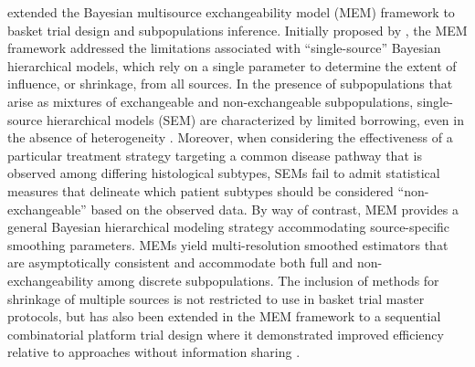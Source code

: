\cite{hobbs2018monitor} extended the Bayesian multisource exchangeability model (MEM) framework to basket trial design and subpopulations inference. Initially proposed by \cite{kaizer2017}, the MEM framework addressed the limitations associated with ``single-source'' Bayesian hierarchical models, which rely on a single parameter to determine the extent of influence, or shrinkage, from all sources. 
In the presence of subpopulations that arise as mixtures of exchangeable and non-exchangeable subpopulations, single-source hierarchical models (SEM) are characterized by limited borrowing, even in the absence of heterogeneity \citep{kaizer2017}. Moreover, when considering the effectiveness of a particular treatment strategy targeting a common disease pathway that is observed among differing histological subtypes, SEMs fail to admit statistical measures that delineate which patient subtypes should be considered ``non-exchangeable'' based on the observed data. 
By way of contrast, MEM provides a general Bayesian hierarchical modeling strategy accommodating source-specific smoothing parameters. MEMs yield multi-resolution smoothed estimators that are asymptotically consistent and accommodate both full and non-exchangeability among discrete subpopulations.
The inclusion of methods for shrinkage of multiple sources is not restricted to use in basket trial master protocols, but has also been extended in the MEM framework to a sequential combinatorial platform trial design where it demonstrated improved efficiency relative to approaches without information sharing \citep{kaizer2018}.

